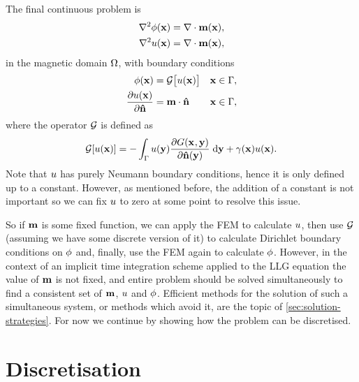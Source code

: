 The final continuous problem is
\begin{equation}
  \begin{aligned}
    \nabla^2 \phi(\boldsymbol{\mathrm{x}}) &= \nabla \cdot \boldsymbol{\mathrm{m}}(\boldsymbol{\mathrm{x}}),  \\
    \nabla^2 u(\boldsymbol{\mathrm{x}}) &= \nabla \cdot \boldsymbol{\mathrm{m}}(\boldsymbol{\mathrm{x}}),
  \end{aligned}
  \label{eq:phi-bem-continuous}
\end{equation}
in the magnetic domain $\Omega$, with boundary conditions
\begin{equation}
  \begin{aligned}
    \phi(\boldsymbol{\mathrm{x}}) &= \mathcal{G} \big[ u(\boldsymbol{\mathrm{x}}) \big]      & \boldsymbol{\mathrm{x}} \in {\Gamma}, \\
    \frac{\partial u(\boldsymbol{\mathrm{x}})}{\partial \boldsymbol{\mathrm{\hat{n}}}} &= \boldsymbol{\mathrm{m}} \cdot \boldsymbol{\mathrm{\hat{n}}}  & \boldsymbol{\mathrm{x}} \in {\Gamma},
    \label{eq:phi-bem-continuous-bc}
  \end{aligned}
\end{equation}
where the operator $\mathcal{G}$ is defined as
\begin{equation}
  \mathcal{G} {\left[ u(\boldsymbol{\mathrm{x}}) \right]} = - \int_{{\Gamma}} u(\boldsymbol{\mathrm{y}}) \frac{\partial G(\boldsymbol{\mathrm{x}}_{},\boldsymbol{\mathrm{y}})}{\partial \boldsymbol{\mathrm{\hat{n}}}(\boldsymbol{\mathrm{y}})} {\; \mathrm{{d}}} \boldsymbol{\mathrm{y}}
  + \gamma(\boldsymbol{\mathrm{x}}) u(\boldsymbol{\mathrm{x}}).
\end{equation}
Note that $u$ has purely Neumann boundary conditions, hence it is only defined up to a constant.
However, as mentioned before, the addition of a constant is not important so we can fix $u$ to zero at some point to resolve this issue.

So if $\boldsymbol{\mathrm{m}}$ is some fixed function, we can apply the FEM to calculate $u$, then use $\mathcal{G}$ (assuming we have some discrete version of it) to calculate Dirichlet boundary conditions on $\phi$ and, finally, use the FEM again to calculate $\phi$.
However, in the context of an implicit time integration scheme applied to the LLG equation the value of $\boldsymbol{\mathrm{m}}$ is not fixed, and entire problem should be solved simultaneously to find a consistent set of $\boldsymbol{\mathrm{m}}$, $u$ and $\phi$.
Efficient methods for the solution of such a simultaneous system, or methods which avoid it, are the topic of \cref{sec:solution-strategies}.
For now we continue by showing how the problem can be discretised.

\section{Discretisation}
\label{sec:discretisation}

\newsubcommand{\tbfone}{\tbf}{}
\newsubcommand{\tbfm}{\tbf}{}

